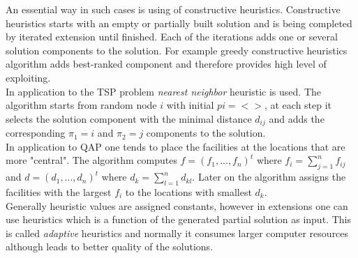 An essential way in such cases is using of constructive heuristics. Constructive heuristics starts with an empty or partially built solution and is being completed by iterated extension until finished. Each of the iterations adds one or several solution components to the solution. For example greedy constructive heuristics algorithm adds best-ranked component and therefore provides high level of exploiting. \\

In application to the TSP problem \emph{nearest neighbor} heuristic is used. The algorithm starts from random node $i$ with initial $pi=<>$, at each step it selects the solution component with the minimal distance $d_{ij}$ and adds the corresponding $\pi_1=i$ and $\pi_2=j$ components to the solution. \\

In application to QAP one tends to place the facilities at the locations that are more "central". The algorithm computes $f=(f_1,...,f_n)^t$ where $f_i=\sum \limits_{j=1}^n {f_{ij}}$ and $d=(d_1,...,d_n)^t$ where $d_k=\sum \limits_{l=1}^n {d_{kl}}$. Later on the algorithm assigns the facilities with the largest $f_i$ to the locations with smallest $d_k$. \\

Generally heuristic values are assigned constants, however in extensions one can use heuristics which is a function of the generated partial solution as input. This is called \emph{adaptive} heuristics and normally it consumes larger computer resources although leads to better quality of the solutions.